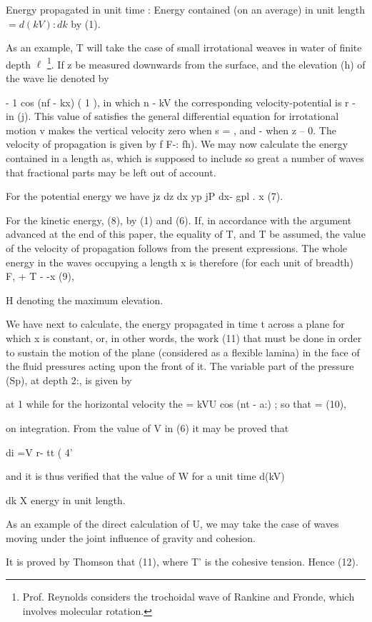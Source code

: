 Energy propagated in unit time : Energy contained (on an average)
in unit length \( =d (kV) : dk\) by (1).

As an example, T will take the case of small irrotational weaves in
water of finite depth
\(\ell\)
\footnote{Prof. Reynolds considers the trochoidal wave of Rankine and Fronde, which
involves molecular rotation.}.
If z be measured downwards from the surface,
and the elevation (h) of the wave lie denoted by

  - 1 cos (nf - kx) ( 1 ),
in which n - kV the corresponding velocity-potential is
r  - in (j).
This value of satisfies the general differential equation for irrotational motion
v makes the vertical velocity zero when
s = , and - when z -- 0. The velocity of propagation is given by
f F-: fh).
We may now calculate the energy contained in a length as, which is
supposed to include so great a number of waves that fractional parts
may be left out of account.

For the potential energy we have
jz dz dx yp jP dx- gpl . x (7).

For the kinetic energy, (8),
by (1) and (6). If, in accordance with the argument advanced at the
end of this paper, the equality of T, and T be assumed, the value of
the velocity of propagation follows from the present expressions. The
whole energy in the waves occupying a length x is therefore
(for each unit of breadth) F, + T - -x (9),

H denoting the maximum elevation.

We have next to calculate, the energy propagated in time t across a
plane for which x is constant, or, in other words, the work (11) that
must be done in order to sustain the motion of the plane (considered
as a flexible lamina) in the face of the fluid pressures acting upon the
front of it. The variable part of the pressure (Sp), at depth 2:, is
given by

at  1
while for the horizontal velocity
the
= kVU
cos (nt - a:) ;
so that = (10),

on integration. From the value of V in (6) it may be proved that

di =V r- tt ( 4'

and it is thus verified that the value of W for a unit time
d(kV)

dk
X
energy in unit length.

As an example of the direct calculation of U, we may take the case
of waves moving under the joint influence of gravity and cohesion.

It is proved by Thomson that
(11),
where T' is the cohesive tension. Hence
(12).

